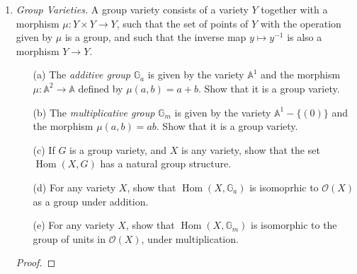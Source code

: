 \documentclass[12pt]{article}
\newcommand{\A}{\mathbb{A}}
\newcommand{\OO}{\mathcal{O}}
\newcommand{\G}{\mathbb{G}}
\DeclareMathOperator{\Hom}{Hom}
\theoremstyle{definition}
\begin{document}
\begin{enumerate} [label=\textbf{\arabic*.}, leftmargin=-0.05em]
\item \textit{Group Varieties.} A group variety consists of a variety $Y$ together with a morphism $\mu : Y \times Y \to Y$, such that the set of points of $Y$ with the operation given by $\mu$ is a group, and such that the inverse map $y \mapsto y^{-1}$ is also a morphism $Y \to Y$.
\begin{itemize}
    \item[(a)] The \textit{additive group} $\G_a$ is given by the variety $\A^1$ and the morphism $\mu : \A^2 \to \A$ defined by $\mu(a, b) = a+ b$. Show that it is a group variety.
    \item[(b)] The \textit{multiplicative group} $\G_m$ is given by the variety $\A^1 - \{(0) \}$ and the morphism $\mu(a, b) = ab$. Show that it is a group variety.
    \item[(c)] If $G$ is a group variety, and $X$ is any variety, show that the set $\Hom{(X, G)}$ has a natural group structure.
    \item[(d)] For any variety $X$, show that $\Hom{(X, \G_a)}$ is isomoprhic to $\OO(X)$ as a group under addition.
    \item[(e)] For any variety $X$, show that $\Hom{(X, \G_m)}$ is isomorphic to the group of units in $\OO(X)$, under multiplication.
\end{itemize}

\begin{proof}
    
\end{proof}

\end{enumerate}
\end{document}
